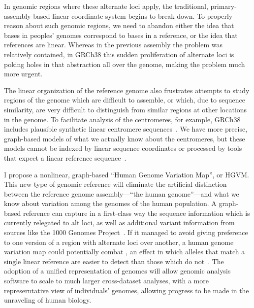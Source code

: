 
In genomic regions where these alternate loci apply, the traditional, primary-assembly-based linear coordinate system begins to break down. To properly reason about such genomic regions, we need to abandon either the idea that bases in peoples' genomes correspond to bases in a reference, or the idea that references are linear. Whereas in the previous assembly the problem was relatively contained, in GRCh38 this sudden proliferation of alternate loci is poking holes in that abstraction all over the genome, making the problem much more urgent.

The linear organization of the reference genome also frustrates attempts to study regions of the genome which are difficult to assemble, or which, due to sequence similarity, are very difficult to distinguish from similar regions at other locations in the genome. To facilitate analysis of the centromeres, for example, GRCh38 includes plausible synthetic linear centromere sequences~\cite{karolchik2014new}. We have more precise, graph-based models of what we actually know about the centromeres, but these models cannot be indexed by linear sequence coordinates or processed by tools that expect a linear reference sequence~\cite{miga2014centromere}.

\begin{sloppypar}
I propose a nonlinear, graph-based ``Human Genome Variation Map'', or HGVM. This new type of genomic reference will eliminate the artificial distinction between the reference genome assembly---``the human genome''---and what we know about variation among the genomes of the human population. A graph-based reference can capture in a first-class way the sequence information which is currently relegated to alt loci, as well as additional variant information from sources like the 1000 Genomes Project~\cite{10002015global}. If it managed to avoid giving preference to one version of a region with alternate loci over another, a human genome variation map could potentially combat , an effect in which alleles that match a single linear reference are easier to detect than those which do not~\cite{degner2009effect,brandt2015mapping}. The adoption of a unified representation of genomes will allow genomic analysis software to scale to much larger cross-dataset analyses, with a more represerntative view of individuals' genomes, allowing progress to be made in the unraveling of human biology.
\end{sloppypar}


